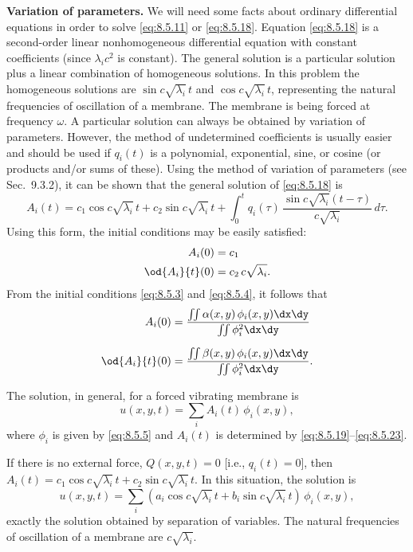 \textbf{Variation of parameters.}
We will need some facts about ordinary differential equations in order to solve \eqref{eq:8.5.11} or \eqref{eq:8.5.18}.  Equation \eqref{eq:8.5.18} is a second-order linear nonhomogeneous differential equation with constant coefficients (since $\lambda_i c^2$ is constant).  The general solution is a particular solution plus a linear combination of homogeneous solutions.  In this problem the homogeneous solutions are $\sin c\sqrt{\lambda_i}\,t$ and $\cos c\sqrt{\lambda_i}\,t$, representing the natural frequencies of oscillation of a membrane.  The membrane is being forced at frequency $\omega$.  A particular solution can always be obtained by variation of parameters.  However, the method of undetermined coefficients is usually easier and should be used if $q_i(t)$ is a polynomial, exponential, sine, or cosine (or products and/or sums of these).  Using the method of variation of parameters (see Sec.~9.3.2), it can be shown that the general solution of \eqref{eq:8.5.18} is
\begin{equation}
\label{eq:8.5.19}
\boxed{A_i(t) = c_1\cos c\sqrt{\lambda_i}\,t + c_2\sin c\sqrt{\lambda_i}\,t
+ \int_0^t q_i(\tau)\,\frac{\sin c\sqrt{\lambda_i}(t-\tau)}{c\sqrt{\lambda_i}}\,d\tau.}
\end{equation}
Using this form, the initial conditions may be easily satisfied:
\begin{align}
\label{eq:8.5.20}
A_i(0) &= c_1 \\
\label{eq:8.5.21}
\od{A_i}{t}(0) &= c_2\,c\sqrt{\lambda_i}.
\end{align}
From the initial conditions \eqref{eq:8.5.3} and \eqref{eq:8.5.4}, it follows that
\begin{align}
\label{eq:8.5.22}
A_i(0) &= \frac{\iint \alpha(x,y)\,\phi_i(x,y)\dx\dy}{\iint \phi_i^2\dx\dy} \\[6pt]
\label{eq:8.5.23}
\od{A_i}{t}(0) &= \frac{\iint \beta(x,y)\,\phi_i(x,y)\dx\dy}{\iint \phi_i^2\dx\dy}.
\end{align}

The solution, in general, for a forced vibrating membrane is
\[
u(x,y,t) = \sum_i A_i(t)\,\phi_i(x,y),
\]
where $\phi_i$ is given by \eqref{eq:8.5.5} and $A_i(t)$ is determined by \eqref{eq:8.5.19}--\eqref{eq:8.5.23}.

If there is no external force, $Q(x,y,t) = 0$ [i.e., $q_i(t) = 0$], then $A_i(t) = c_1\cos c\sqrt{\lambda_i}\,t + c_2\sin c\sqrt{\lambda_i}\,t$.  In this situation, the solution is
\[
u(x,y,t) = \sum_i (a_i\cos c\sqrt{\lambda_i}\,t + b_i\sin c\sqrt{\lambda_i}\,t)\,\phi_i(x,y),
\]
exactly the solution obtained by separation of variables.  The natural frequencies of oscillation of a membrane are $c\sqrt{\lambda_i}$.

